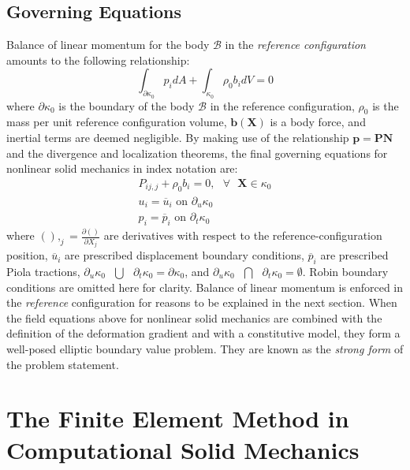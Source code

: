 \subsection{Governing Equations}
Balance of linear momentum for the body $\mathcal{B}$ in the \textit{reference configuration} amounts to the following relationship:
\begin{equation}
\int_{\partial \kappa_0}{p_i}dA + \int_{\kappa_0}\rho_0{b}_idV = 0
\end{equation}
where $\partial \kappa_0$ is the boundary of the body $\mathcal{B}$ in the reference configuration, $\rho_0$ is the mass per unit reference configuration volume, $\bm{b}(\bm{X})$ is a body force, and inertial terms are deemed negligible. By making use of the relationship $\bm{p} = \bm{P}\bm{N}$ and the divergence and localization theorems, the final governing equations for nonlinear solid mechanics in index notation are:
\begin{gather}
P_{ij,j} + \rho_0b_i = 0, \text{\ \ } \forall \text{\ \ } \bm{X} \in \kappa_0 \label{eqn:equilibrium} \\
{u_i} = \overline{{u}}_i \text{\ \ on\ \ } \partial_u\kappa_0 \\
{p_i} = \overline{{p}}_i\text{\ \ on\ \ } \partial_t\kappa_0
\end{gather}
where $(),_j = \frac{\partial()}{\partial {{X_j}}}$ are derivatives with respect to the reference-configuration position, $\overline{{u}}_i$ are prescribed displacement boundary conditions, ${\overline{p}_i}$ are prescribed Piola tractions, $\partial_u\kappa_0 \text{\ }\bigcup\text{\ } \partial_t\kappa_0 = \partial\kappa_0$, and $\partial_u\kappa_0 \text{\ }\bigcap\text{\ } \partial_t\kappa_0 = \emptyset$. Robin boundary conditions are omitted here for clarity. Balance of linear momentum is enforced in the \textit{reference} configuration for reasons to be explained in the next section. When the field equations above for nonlinear solid mechanics are combined with the definition of the deformation gradient and with a constitutive model, they form a well-posed elliptic boundary value problem. They are known as the \textit{strong form} of the problem statement.

\section{The Finite Element Method in Computational Solid Mechanics}
\label{The Finite Element Method in Computational Solid Mechanics}

